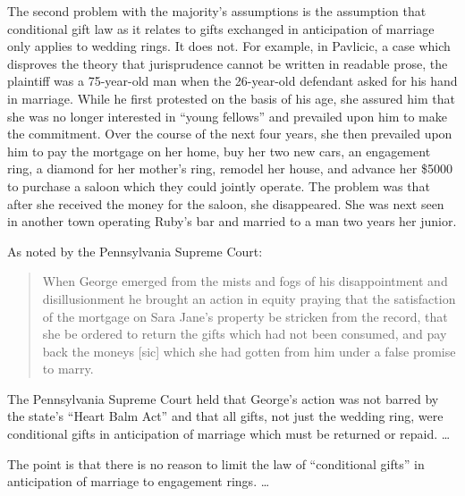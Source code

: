 The second problem with the majority's assumptions is the assumption that
conditional gift law as it relates to gifts exchanged in anticipation of
marriage only applies to wedding rings. It does not. For example, in Pavlicic,
a case which disproves the theory that jurisprudence cannot be written in
readable prose, the plaintiff was a 75-year-old man when the 26-year-old
defendant asked for his hand in marriage. While he first protested on the basis
of his age, she assured him that she was no longer interested in ``young
fellows'' and prevailed upon him to make the commitment. Over the course of the
next four years, she then prevailed upon him to pay the mortgage on her home,
buy her two new cars, an engagement ring, a diamond for her mother's ring,
remodel her house, and advance her \$5000 to purchase a saloon which they could
jointly operate. The problem was that after she received the money for the
saloon, she disappeared. She was next seen in another town operating Ruby's bar
and married to a man two years her junior. 

As noted by the Pennsylvania Supreme Court:

\begin{quote}
When George emerged from the mists and fogs of his disappointment and
disillusionment he brought an action in equity praying that the satisfaction of
the mortgage on Sara Jane's property be stricken from the record, that she be
ordered to return the gifts which had not been consumed, and pay back the
moneys [sic] which she had gotten from him under a false promise to marry.
\end{quote}

The Pennsylvania Supreme Court held that George's action was not barred by the
state's ``Heart Balm Act'' and that all gifts, not just the wedding ring, were
conditional gifts in anticipation of marriage which must be returned or repaid.
\dots{}

The point is that there is no reason to limit the law of ``conditional gifts''
in anticipation of marriage to engagement rings. \dots{}

